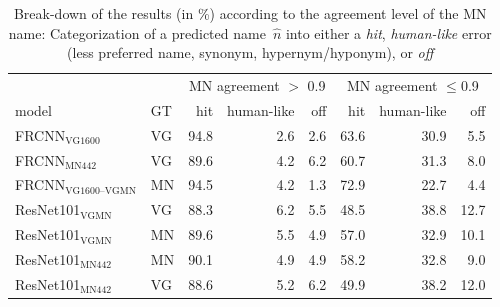 \begin{table}[t]
\centering
	\small
\begin{tabular}{ll|rrr|rrr}
\toprule
&  & \multicolumn{3}{c|}{MN agreement $>$ 0.9} & \multicolumn{3}{c}{MN agreement $\leq$0.9}\\
                         model &  GT &  hit &  human-like &  off &  hit &  human-like &  off \\
\midrule
       FRCNN$_{\text{VG1600}}$ &  VG &   94.8 &           2.6 &      2.6 &   63.6 &          30.9 &      5.5 \\
        FRCNN$_{\text{MN442}}$ &  VG &   89.6 &           4.2 &      6.2 &   60.7 &          31.3 &      8.0 \\
        \midrule
 FRCNN$_{\text{VG1600--VGMN}}$ &  MN &   94.5 &           4.2 &      1.3 &   72.9 &          22.7 &      4.4 \\
 \midrule
     ResNet101$_{\text{VGMN}}$ &  VG &   88.3 &           6.2 &      5.5 &   48.5 &          38.8 &     12.7 \\
     ResNet101$_{\text{VGMN}}$ &  MN &   89.6 &           5.5 &      4.9 &   57.0 &          32.9 &     10.1 \\
    ResNet101$_{\text{MN442}}$ &  MN &   90.1 &           4.9 &      4.9 &   58.2 &          32.8 &      9.0 \\
    ResNet101$_{\text{MN442}}$ &  VG &   88.6 &           5.2 &      6.2 &   49.9 &          38.2 &     12.0 \\
\bottomrule
\end{tabular}
\caption{Break-down of the results (in \%) according to the agreement level of the MN name: Categorization of a predicted name\ $\hat{n}$ into either a \textit{hit}, \textit{human-like} error (less preferred name, synonym, hypernym/hyponym), or \textit{off} \label{tab:exp_errors_agreement}}
\end{table}

